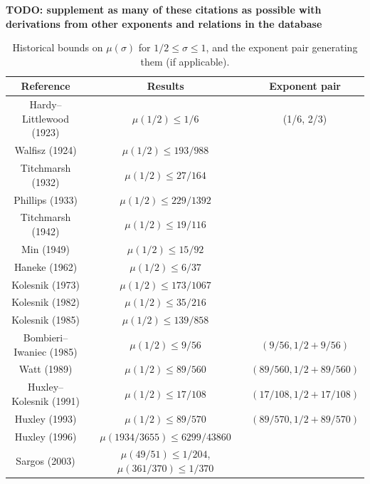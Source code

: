 \textbf{TODO: supplement as many of these citations as possible with derivations from other exponents and relations in the database}

\begin{table}[ht]
\caption{Historical bounds on $\mu(\sigma)$ for $1/2 \le \sigma \le 1$, and the exponent pair generating them (if applicable).}
\label{mu-table}
\centering
\renewcommand{\arraystretch}{1.2}
\begin{tabular}{|c|c|c|}
\hline
Reference & Results & Exponent pair \\
\hline
Hardy--Littlewood (1923) \cite{hardy_littlewood_1923} & $\mu(1/2) \le 1/6$ & (1/6, 2/3)\\
\hline
Walfisz (1924) \cite{walfisz_1924} & $\mu(1/2) \le 193/988$ & \\
\hline
Titchmarsh (1932) \cite{titchmarsh_van_1931} & $\mu(1/2) \leq 27/164$ & \\
\hline
Phillips (1933) \cite{phillips_zeta_1933} & $\mu(1/2) \leq 229/1392$ & \\
\hline
Titchmarsh (1942) \cite{titchmarsh_order_1942}  & $\mu(1/2) \leq 19/116$ & \\
\hline
Min (1949) \cite{min_on_1949} & $\mu(1/2) \leq 15/92$ & \\
\hline
Haneke (1962) \cite{haneke_verscharfung_1963} & $\mu(1/2) \leq 6/37$&  \\
\hline
Kolesnik (1973) \cite{kolesnik_1973} & $\mu(1/2) \leq 173/1067$ & \\
\hline
Kolesnik (1982) \cite{kolesnik_order_1982} & $\mu(1/2) \leq 35/216$ & \\
\hline
Kolesnik (1985) \cite{kolesnik_1985} & $\mu(1/2) \leq 139/858$ & \\
\hline
Bombieri--Iwaniec (1985) \cite{bombieri_order_1986} & $\mu(1/2) \leq 9/56$ & $(9/56, 1/2+9/56)$\\
\hline
Watt (1989) \cite{watt_exponential_1989} & $\mu(1/2) \leq 89/560$ & $(89/560, 1/2+89/560)$\\
\hline
Huxley--Kolesnik (1991) \cite{huxley_exponential_1991} & $\mu(1/2) \leq 17/108$ & $(17/108, 1/2+17/108)$\\
\hline
Huxley (1993) \cite{huxley_exponential_1993} & $\mu(1/2) \leq 89/570$ & $(89/570, 1/2+89/570)$\\
\hline
Huxley (1996) \cite{huxley_area_1996} & $\mu(1934/3655) \leq 6299/43860$ & \\
\hline
Sargos (2003) \cite{sargos_analog_2003} & $\mu(49/51) \leq 1/204$, $\mu(361/370) \leq 1/370$&  \\

\end{tabular}
\end{table}
